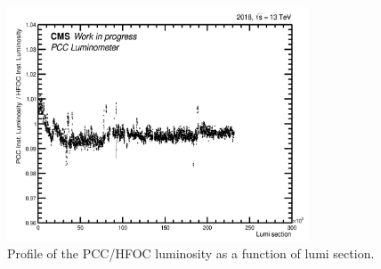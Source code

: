 \begin{itemize}
\begin{figure}[!htp]
\centering
\includegraphics[width=0.8\textwidth]{ashish_thesis/PCC_HFOCvsls_ProfileX_all_1.png}
\caption[Luminosity Ratio Profile]{Profile of the PCC/HFOC luminosity as a function of lumi section.}
\label{fig:stabprof_7098}
\end{figure}



\end{itemize}
